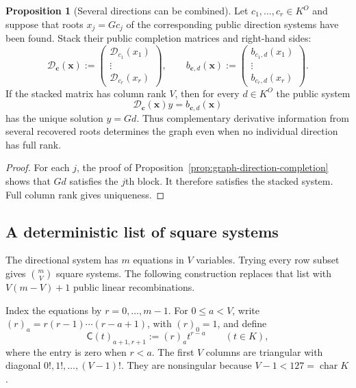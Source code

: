 \documentclass[11pt,a4paper]{article}
\theoremstyle{definition}
\newtheorem{proposition}[theorem]{Proposition}
\theoremstyle{remark}
\begin{document}
\begin{proposition}[Several directions can be combined]\label{prop:multi-direction-completion}
Let $c_1,\ldots,c_r\in K^O$ and suppose that roots $x_j=Gc_j$ of the
corresponding public direction systems have been found.  Stack their public
completion matrices and right-hand sides:
\[
 \mathcal D_{\boldsymbol c}(\boldsymbol x)
 :=\begin{pmatrix}\mathcal D_{c_1}(x_1)\\ \vdots\\ \mathcal D_{c_r}(x_r)\end{pmatrix},
 \qquad
 b_{\boldsymbol c,d}(\boldsymbol x)
 :=\begin{pmatrix}b_{c_1,d}(x_1)\\ \vdots\\ b_{c_r,d}(x_r)\end{pmatrix}.
\]
If the stacked matrix has column rank $V$, then for every $d\in K^O$ the
public system
\[
 \mathcal D_{\boldsymbol c}(\boldsymbol x)y
 =b_{\boldsymbol c,d}(\boldsymbol x)
\]
has the unique solution $y=Gd$.  Thus complementary derivative information
from several recovered roots determines the graph even when no individual
direction has full rank.
\end{proposition}

\begin{proof}
For each $j$, the proof of Proposition~\ref{prop:graph-direction-completion}
shows that $Gd$ satisfies the $j$th block.  It therefore satisfies the stacked
system.  Full column rank gives uniqueness.
\end{proof}

\subsection{A deterministic list of square systems}

The directional system has $m$ equations in $V$ variables.  Trying every row
subset gives $\binom mV$ square systems.  The following construction replaces
that list with $V(m-V)+1$ public linear recombinations.

Index the equations by $r=0,\ldots,m-1$.  For $0\le a<V$, write
$(r)_a=r(r-1)\cdots(r-a+1)$, with $(r)_0=1$, and define
\begin{equation}\label{eq:wronskian-condenser}
 \mathsf C(t)_{a+1,r+1}:=(r)_a t^{r-a}
 \qquad(t\in K),
\end{equation}
where the entry is zero when $r<a$.  The first $V$ columns are triangular with
diagonal $0!,1!,\ldots,(V-1)!$.  They are nonsingular because
$V-1<127=\operatorname{char}K$.
\end{document}
